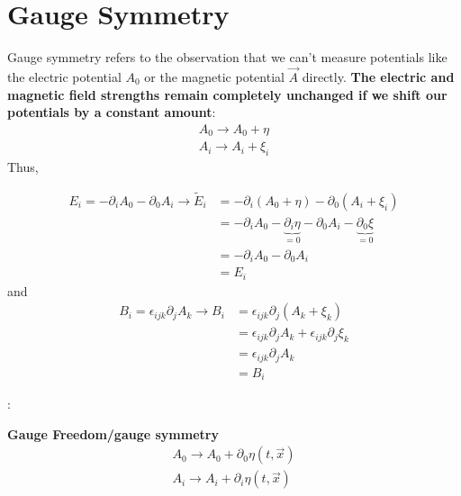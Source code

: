 \section{Gauge Symmetry}
Gauge symmetry refers to the observation that we can't measure potentials like the electric potential $A_{0}$ or the magnetic potential $\vec{A}$ directly.\textbf{ The electric and magnetic field strengths remain completely unchanged if we shift our potentials by a constant amount}:
$$
\begin{array}{l}
{A_{0} \rightarrow A_{0}+\eta} \\
{A_{i} \rightarrow A_{i}+\xi_{i}}
\end{array}
$$
Thus,
\begin{qt}
\begin{equation}
\begin{aligned}
E_{i}=-\partial_{i} A_{0}-\partial_{0} A_{i} \rightarrow \tilde{E}_{i} &=-\partial_{i}\left(A_{0}+\eta\right)-\partial_{0}\left(A_{i}+\xi_{i}\right) \\
&=-\partial_{i} A_{0}-\underbrace{\partial_{i} \eta}_{=0}-\partial_{0} A_{i}-\underbrace{\partial_{0} \xi}_{=0} \\
&=-\partial_{i} A_{0}-\partial_{0} A_{i} \\
&=E_{i} 
\end{aligned}
\end{equation}
and
\begin{equation}
\begin{aligned}
B_{i}=\epsilon_{i j k} \partial_{j} A_{k} \rightarrow B_{i} &=\epsilon_{i j k} \partial_{j}\left(A_{k}+\xi_{k}\right) \\
&=\epsilon_{i j k} \partial_{j} A_{k}+\epsilon_{i j k} \partial_{j} \xi_{k} \\
&=\epsilon_{i j k} \partial_{j} A_{k} \\
&=B_{i} 
\end{aligned}
\end{equation}
\end{qt}
:
\begin{qt}
\textbf{Gauge Freedom/gauge symmetry}
\begin{equation}
\begin{array}{l}
{A_{0} \rightarrow A_{0}+\partial_{0} \eta(t, \vec{x})} \\
{A_{i} \rightarrow A_{i}+\partial_{i} \eta(t, \vec{x})}
\end{array}
\end{equation}
\end{qt}

